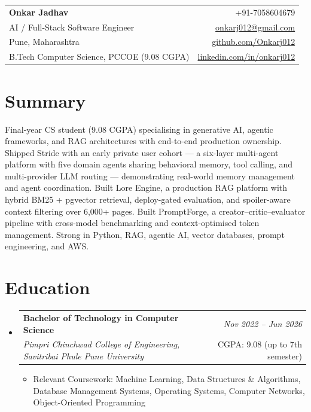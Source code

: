 \documentclass[a4paper,11pt]{article}
\makeatletter
\newcommand{\resumeSubheading}[4]{
\vspace{0.5mm}\item
    \begin{tabular*}{0.98\textwidth}[t]{l@{\extracolsep{\fill}}r}
        \textbf{#1} & \textit{\footnotesize{#4}} \\
        \textit{\footnotesize{#3}} & \footnotesize{#2}\\
    \end{tabular*}
    \vspace{-2.4mm}
}
\newcommand{\resumeSubHeadingListStart}{\begin{itemize}[leftmargin=*,labelsep=0mm]}
\newcommand{\resumeItemListStart}{\begin{justify}\begin{itemize}[leftmargin=3ex, rightmargin=2ex, noitemsep,labelsep=1.2mm,itemsep=0mm]\small}
\newcommand{\resumeSubHeadingListEnd}{\end{itemize}\vspace{2mm}}
\newcommand{\resumeItemListEnd}{\end{itemize}\end{justify}\vspace{-2mm}}
\newcommand{\name}{Onkar Jadhav}
\newcommand{\phone}{7058604679}
\newcommand{\emaila}{onkarj012@gmail.com}
\newcommand{\github}{github.com/Onkarj012}
\newcommand{\linkedin}{linkedin.com/in/onkarj012}
\makeatother
\begin{document}
\begin{tabularx}{\linewidth}{L r}
  \textbf{\Large \name} & {+91-\phone} \\
  {AI / Full-Stack Software Engineer} & \href{mailto:\emaila}{\emaila} \\
  {Pune, Maharashtra} & \href{https://\github}{\github} \\
  {B.Tech Computer Science, PCCOE (9.08 CGPA)} & \href{https://\linkedin}{\linkedin}
\end{tabularx}
\vspace{-4mm}

\section{\textbf{Summary}}
\vspace{1mm}
\small{
Final-year CS student (9.08 CGPA) specialising in generative AI, agentic frameworks, and RAG architectures with end-to-end production ownership. Shipped Stride with an early private user cohort --- a six-layer multi-agent platform with five domain agents sharing behavioral memory, tool calling, and multi-provider LLM routing --- demonstrating real-world memory management and agent coordination. Built Lore Engine, a production RAG platform with hybrid BM25 + pgvector retrieval, deploy-gated evaluation, and spoiler-aware context filtering over 6,000+ pages. Built PromptForge, a creator--critic--evaluator pipeline with cross-model benchmarking and context-optimised token management. Strong in Python, RAG, agentic AI, vector databases, prompt engineering, and AWS.
}
\vspace{-3mm}

\section{\textbf{Education}}
  \resumeSubHeadingListStart
    \resumeSubheading
      {Bachelor of Technology in Computer Science}{CGPA: 9.08 (up to 7th semester)}
      {Pimpri Chinchwad College of Engineering, Savitribai Phule Pune University}{Nov 2022 -- Jun 2026}
      \resumeItemListStart
        \item {Relevant Coursework: Machine Learning, Data Structures \& Algorithms, Database Management Systems, Operating Systems, Computer Networks, Object-Oriented Programming}
      \resumeItemListEnd
  \resumeSubHeadingListEnd
\vspace{-5.5mm}
\end{document}
